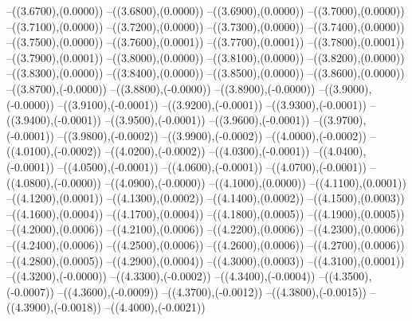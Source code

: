 {	--({\sx*(3.6700)},{\sy*(0.0000)})
	--({\sx*(3.6800)},{\sy*(0.0000)})
	--({\sx*(3.6900)},{\sy*(0.0000)})
	--({\sx*(3.7000)},{\sy*(0.0000)})
	--({\sx*(3.7100)},{\sy*(0.0000)})
	--({\sx*(3.7200)},{\sy*(0.0000)})
	--({\sx*(3.7300)},{\sy*(0.0000)})
	--({\sx*(3.7400)},{\sy*(0.0000)})
	--({\sx*(3.7500)},{\sy*(0.0000)})
	--({\sx*(3.7600)},{\sy*(0.0001)})
	--({\sx*(3.7700)},{\sy*(0.0001)})
	--({\sx*(3.7800)},{\sy*(0.0001)})
	--({\sx*(3.7900)},{\sy*(0.0001)})
	--({\sx*(3.8000)},{\sy*(0.0000)})
	--({\sx*(3.8100)},{\sy*(0.0000)})
	--({\sx*(3.8200)},{\sy*(0.0000)})
	--({\sx*(3.8300)},{\sy*(0.0000)})
	--({\sx*(3.8400)},{\sy*(0.0000)})
	--({\sx*(3.8500)},{\sy*(0.0000)})
	--({\sx*(3.8600)},{\sy*(0.0000)})
	--({\sx*(3.8700)},{\sy*(-0.0000)})
	--({\sx*(3.8800)},{\sy*(-0.0000)})
	--({\sx*(3.8900)},{\sy*(-0.0000)})
	--({\sx*(3.9000)},{\sy*(-0.0000)})
	--({\sx*(3.9100)},{\sy*(-0.0001)})
	--({\sx*(3.9200)},{\sy*(-0.0001)})
	--({\sx*(3.9300)},{\sy*(-0.0001)})
	--({\sx*(3.9400)},{\sy*(-0.0001)})
	--({\sx*(3.9500)},{\sy*(-0.0001)})
	--({\sx*(3.9600)},{\sy*(-0.0001)})
	--({\sx*(3.9700)},{\sy*(-0.0001)})
	--({\sx*(3.9800)},{\sy*(-0.0002)})
	--({\sx*(3.9900)},{\sy*(-0.0002)})
	--({\sx*(4.0000)},{\sy*(-0.0002)})
	--({\sx*(4.0100)},{\sy*(-0.0002)})
	--({\sx*(4.0200)},{\sy*(-0.0002)})
	--({\sx*(4.0300)},{\sy*(-0.0001)})
	--({\sx*(4.0400)},{\sy*(-0.0001)})
	--({\sx*(4.0500)},{\sy*(-0.0001)})
	--({\sx*(4.0600)},{\sy*(-0.0001)})
	--({\sx*(4.0700)},{\sy*(-0.0001)})
	--({\sx*(4.0800)},{\sy*(-0.0000)})
	--({\sx*(4.0900)},{\sy*(-0.0000)})
	--({\sx*(4.1000)},{\sy*(0.0000)})
	--({\sx*(4.1100)},{\sy*(0.0001)})
	--({\sx*(4.1200)},{\sy*(0.0001)})
	--({\sx*(4.1300)},{\sy*(0.0002)})
	--({\sx*(4.1400)},{\sy*(0.0002)})
	--({\sx*(4.1500)},{\sy*(0.0003)})
	--({\sx*(4.1600)},{\sy*(0.0004)})
	--({\sx*(4.1700)},{\sy*(0.0004)})
	--({\sx*(4.1800)},{\sy*(0.0005)})
	--({\sx*(4.1900)},{\sy*(0.0005)})
	--({\sx*(4.2000)},{\sy*(0.0006)})
	--({\sx*(4.2100)},{\sy*(0.0006)})
	--({\sx*(4.2200)},{\sy*(0.0006)})
	--({\sx*(4.2300)},{\sy*(0.0006)})
	--({\sx*(4.2400)},{\sy*(0.0006)})
	--({\sx*(4.2500)},{\sy*(0.0006)})
	--({\sx*(4.2600)},{\sy*(0.0006)})
	--({\sx*(4.2700)},{\sy*(0.0006)})
	--({\sx*(4.2800)},{\sy*(0.0005)})
	--({\sx*(4.2900)},{\sy*(0.0004)})
	--({\sx*(4.3000)},{\sy*(0.0003)})
	--({\sx*(4.3100)},{\sy*(0.0001)})
	--({\sx*(4.3200)},{\sy*(-0.0000)})
	--({\sx*(4.3300)},{\sy*(-0.0002)})
	--({\sx*(4.3400)},{\sy*(-0.0004)})
	--({\sx*(4.3500)},{\sy*(-0.0007)})
	--({\sx*(4.3600)},{\sy*(-0.0009)})
	--({\sx*(4.3700)},{\sy*(-0.0012)})
	--({\sx*(4.3800)},{\sy*(-0.0015)})
	--({\sx*(4.3900)},{\sy*(-0.0018)})
	--({\sx*(4.4000)},{\sy*(-0.0021)})
}
